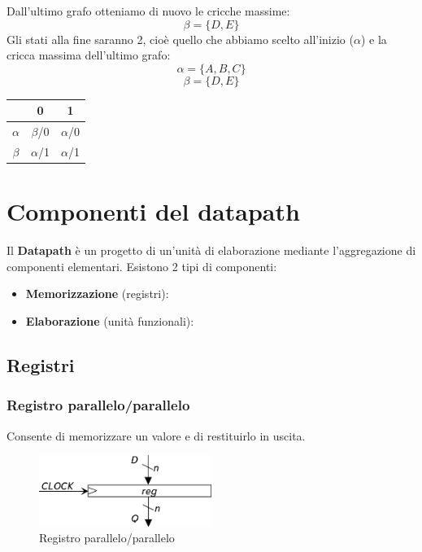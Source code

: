 \documentclass[a4paper]{article}
\theoremstyle{break}
\theoremstyle{break}
\theoremstyle{break}
\theoremstyle{break}
\begin{document}
Dall'ultimo grafo otteniamo di nuovo le cricche massime:
\[
\beta = \{D,E\} 
\] 
Gli stati alla fine saranno 2, cioè quello che abbiamo scelto all'inizio (\( \alpha \)) e
la cricca massima dell'ultimo grafo:
\[
\alpha = \{A,B,C\}
\] 
\[
\beta = \{D,E\} 
\] 
\begin{table}[H]
  \begin{center}
    \begin{tabular}{c|c|c}
      & 0 & 1\\
      \hline
      \( \alpha \) & \( \beta \)/0 & \( \alpha \)/0 \\
      \( \beta \) & \( \alpha \)/1 & \( \alpha \)/1 \\
    \end{tabular}
  \end{center}
\end{table}

\section{Componenti del datapath}
Il \textbf{Datapath} è un progetto di un'unità di elaborazione mediante l'aggregazione di componenti elementari.
Esistono 2 tipi di componenti:
\begin{itemize}
  \item \textbf{Memorizzazione} (registri):
  \item \textbf{Elaborazione} (unità funzionali):
\end{itemize}

\subsection{Registri}
\subsubsection{Registro parallelo/parallelo}
Consente di memorizzare un valore e di restituirlo in uscita.
\begin{figure}[H]
  \begin{center}
    \includegraphics[width=0.50\textwidth]{figures/reg-pp}
  \end{center}
  \caption{Registro parallelo/parallelo}
\end{figure}
\end{document}
